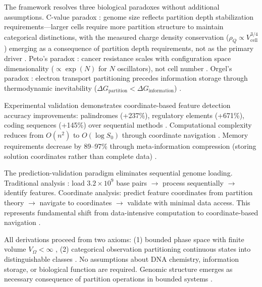 \documentclass[11pt,a4paper]{article}
\theoremstyle{remark}
\begin{document}
The framework resolves three biological paradoxes without additional assumptions. C-value paradox \citep{gregory2001coincidence, gregory2005genome}: genome size reflects partition depth stabilization requirements---larger cells require more partition structure to maintain categorical distinctions, with the measured charge density conservation ($\rho_Q \propto V_{\text{cell}}^{3/4}$) emerging as a consequence of partition depth requirements, not as the primary driver \citep{Sachikonye2025_CValue, Sachikonye2025_Partition}. Peto's paradox \citep{peto1977naturally, caulin2015petos}: cancer resistance scales with configuration space dimensionality ($\propto \exp(N)$ for $N$ oscillators), not cell number \citep{Sachikonye2025_Peto}. Orgel's paradox \citep{orgel1968evolution, orgel2004prebiotic}: electron transport partitioning precedes information storage through thermodynamic inevitability ($\Delta G_{\text{partition}} < \Delta G_{\text{information}}$) \citep{russell2007alkaline, Sachikonye2025_Origins}.

Experimental validation demonstrates coordinate-based feature detection accuracy improvements: palindromes (+237\%), regulatory elements (+671\%), coding sequences (+145\%) over sequential methods \citep{benson1999tandem, bailey1994fitting, stormo2000dna}. Computational complexity reduces from $O(n^2)$ to $O(\log S_0)$ through coordinate navigation \citep{landauer1961irreversibility}. Memory requirements decrease by 89--97\% through meta-information compression (storing solution coordinates rather than complete data) \citep{shannon1948mathematical}.

The prediction-validation paradigm eliminates sequential genome loading. Traditional analysis \citep{altschul1990basic, needleman1970general}: load $3.2 \times 10^9$ base pairs $\to$ process sequentially $\to$ identify features. Coordinate analysis: predict feature coordinates from partition theory $\to$ navigate to coordinates $\to$ validate with minimal data access. This represents fundamental shift from data-intensive computation to coordinate-based navigation \citep{landauer1961irreversibility, shannon1948mathematical}.

All derivations proceed from two axioms: (1) bounded phase space with finite volume $V_{\Omega} < \infty$ \citep{poincare1890probleme, arnold1978mathematical}, (2) categorical observation partitioning continuous states into distinguishable classes \citep{kolmogorov1957theory, shannon1948mathematical}. No assumptions about DNA chemistry, information storage, or biological function are required. Genomic structure emerges as necessary consequence of partition operations in bounded systems \citep{birkhoff1931proof}.
\end{document}
